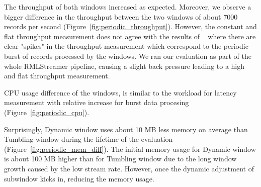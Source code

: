 The throughput of both windows increased as expected.
Moreover, we observe a bigger difference in the throughput between the 
two windows of about 7000 records per second 
(Figure~\ref{fig:periodic_throughput}). However, the
constant and flat throughput measurement does not agree 
with the results of ~\cite{evalution_of_spe} where there are clear "spikes" in 
the throughput measurement which correspond to the periodic burst 
of records processed by the windows. 
We ran our evaluation as part of the whole RMLStreamer pipeline, causing 
a slight back pressure 
leading to a high and flat throughput measurement. 

CPU usage difference of the windows, is similar to the 
workload for latency measurement with relative increase for 
burst data procesing
(Figure~\ref{fig:periodic_cpu}). 

Surprisingly,
Dynamic window uses 
about 10 MB less memory on average than Tumbling window during the lifetime of the evaluation (Figure~\ref{fig:periodic_mem_diff}). 
The initial memory usage for Dynamic window is about 100 MB higher than for 
Tumbling window due to the long window growth 
caused by the low stream rate. However, once 
the dynamic adjustment of subwindow kicks in, reducing the memory usage.


